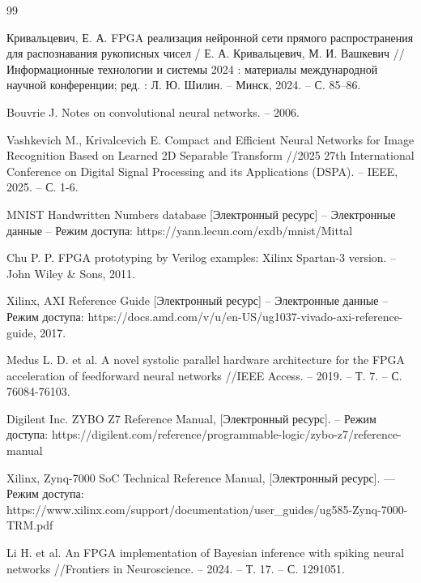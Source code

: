 \begin{thebibliography}{99}
    \setlength{\itemindent}{1.95cm} %
    \setlength{\leftmargin}{1.25cm} %
    \setlength{\labelsep}{2mm} %

    \raggedright%
    \justifying
     Кривальцевич, Е. А. FPGA реализация нейронной сети прямого распространения для распознавания рукописных чисел / Е. А. Кривальцевич, М. И. Вашкевич // Информационные технологии и системы 2024 : материалы международной научной конференции; ред. : Л. Ю. Шилин. – Минск, 2024. – С. 85–86.
        
     Bouvrie J. Notes on convolutional neural networks. – 2006.
    
     Vashkevich M., Krivalcevich E. Compact and Efficient Neural Networks for Image Recognition Based on Learned 2D Separable Transform //2025 27th International Conference on Digital Signal Processing and its Applications (DSPA). – IEEE, 2025. – С. 1-6.
    
     MNIST Handwritten Numbers database [Электронный ресурс] – Электронные данные – Режим доступа: https://yann.lecun.com/exdb/mnist/Mittal

     Chu P. P. FPGA prototyping by Verilog examples: Xilinx Spartan-3 version. – John Wiley \& Sons, 2011.

     Xilinx, {AXI Reference Guide} [Электронный ресурс] – Электронные данные – Режим доступа: https://docs.amd.com/v/u/en-US/ug1037-vivado-axi-reference-guide, 2017.

      Medus L. D. et al. A novel systolic parallel hardware architecture for the FPGA acceleration of feedforward neural networks //IEEE Access. – 2019. – Т. 7. – С. 76084-76103.

     Digilent Inc. ZYBO Z7 Reference Manual, [Электронный ресурс]. – Режим доступа: https://digilent.com/reference/programmable-logic/zybo-z7/reference-manual

     Xilinx, Zynq-7000 SoC Technical Reference Manual, [Электронный ресурс]. — Режим доступа: https://www.xilinx.com/support/documentation/user\_guides/ug585-Zynq-7000-TRM.pdf

     Li H. et al. An FPGA implementation of Bayesian inference with spiking neural networks //Frontiers in Neuroscience. – 2024. – Т. 17. – С. 1291051.
    

\end{thebibliography}
